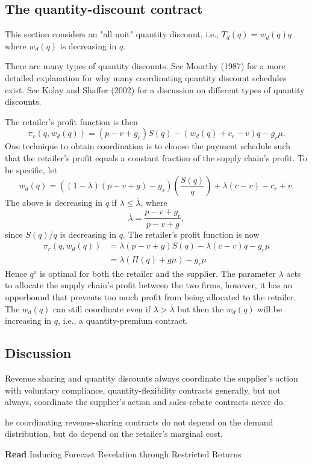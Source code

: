 \subsection{The quantity-discount contract}
This section considers an "all unit" quantity discount, i.e., $T_d(q)=w_d(q)q$ where $w_d(q)$ is decreasing in $q$.
\begin{note}
    There are many types of quantity discounts. See Moorthy (1987) for a more detailed explanation for why many coordinating quantity discount schedules exist. See Kolay and Shaffer (2002) for a discussion on different types of quantity discounts. 
\end{note}
The retailer's profit function is then 
$$\pi_r(q,w_d(q))=(p-v+g_r)S(q)-(w_d(q)+c_r-v)q-g_r\mu.$$
One technique to obtain coordination is to choose the payment schedule such that the retailer's profit equals a constant fraction of the supply chain's profit. To be specific, let 
$$w_d(q)=((1-\lambda)(p-v+g)-g_s)\left(\frac{S(q)}{q}\right)+\lambda(c-v)-c_r+v.$$
The above is decreasing in $q$ if $\lambda\leq\overline{\lambda}$, where 
$$\overline{\lambda}=\frac{p-v+g_r}{p-v+g},$$
since $S(q)/q$ is decreasing in $q$. The retailer's profit function is now 
\begin{align*}
    \pi_r(q,w_d(q))&=\lambda(p-v+g)S(q)-\lambda(c-v)q-g_r\mu\\
    &=\lambda(\Pi(q)+g\mu)-g_r\mu
\end{align*}
Hence $q^o$ is optimal for both the retailer and the supplier. The parameter $\lambda$ acts to allocate the supply chain's profit between the two firms, however, it has an upperbound that prevents too much profit from being allocated to the retailer. The $w_d(q)$ can still coordinate even if $\lambda>\overline{\lambda}$ but then the $w_d(q)$ will be increasing in $q$, i.e., a quantity-premium contract.

\subsection{Discussion}
Revenue sharing and quantity discounts always coordinate the supplier's action with voluntary compliance, quantity-flexibility contracts generally, but not always, coordinate the supplier's action and sales-rebate contracts never do.

he coordinating revenue-sharing contracts do not depend on the demand distribution, but do depend on the retailer's marginal cost.
\begin{note}
    \textbf{Read} Inducing Forecast Revelation through Restricted Returns
\end{note}



